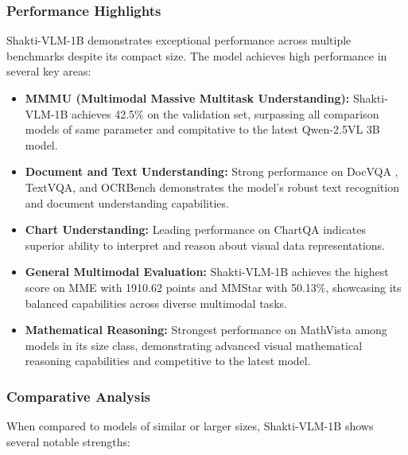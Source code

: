 \documentclass{article}
\begin{document}
\subsubsection{Performance Highlights}
Shakti-VLM-1B demonstrates exceptional performance across multiple benchmarks despite its compact size. The model achieves high performance in several key areas: 
\begin{itemize}
    \item \textbf{MMMU (Multimodal Massive Multitask Understanding):} Shakti-VLM-1B achieves 42.5\% on the validation set, surpassing all comparison models of same parameter and compitative to the latest Qwen-2.5VL 3B\cite{bai2025qwen25vltechnicalreport} model.

    \item \textbf{Document and Text Understanding:} Strong performance on DocVQA , TextVQA, and OCRBench demonstrates the model's robust text recognition and document understanding capabilities. 

    \item \textbf{Chart Understanding:} Leading performance on ChartQA  indicates superior ability to interpret and reason about visual data representations.

    \item \textbf{General Multimodal Evaluation:} Shakti-VLM-1B achieves the highest score on MME  with 1910.62 points and MMStar with 50.13\%, showcasing its balanced capabilities across diverse multimodal tasks.

    \item \textbf{Mathematical Reasoning:} Strongest performance on MathVista among models in its size class, demonstrating advanced visual mathematical reasoning capabilities and competitive to the latest model.
\end{itemize}



\subsubsection{Comparative Analysis }
When compared to models of similar or larger sizes, Shakti-VLM-1B shows several notable strengths: 
\end{document}
